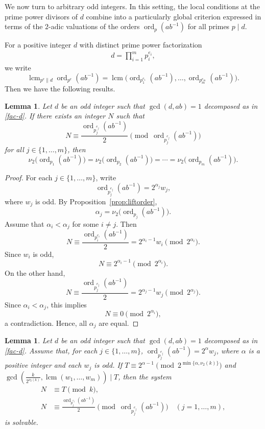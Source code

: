 \documentclass[pdflatex,sn-mathphys-num]{sn-jnl}%
\theoremstyle{thmstyleone}%
\newtheorem{lemma}[theorem]{Lemma}%
\theoremstyle{thmstyletwo}%
\theoremstyle{thmstylethree}%
\newcommand{\ord}{\operatorname{ord}}
\newcommand{\lcm}{\operatorname{lcm}}
\begin{document}
We now turn to arbitrary odd integers. In this setting, the local conditions at the prime power divisors of $d$ combine into a particularly   global criterion  expressed in terms of the $2$-adic valuations of the orders $\ord_p(ab^{-1})$ for all primes $p\mid d$.

For a positive integer $d$ with distinct prime power factorization
\begin{align}\label{fac-d}
d=\displaystyle\prod_{i=1}^m p_i^{e_i},
\end{align}
we write
\[
\lcm_{p^e\parallel d}\ord_{p^e}(ab^{-1})
=
\lcm\bigl(\ord_{p_1^{e_1}}(ab^{-1}),\dots,\ord_{p_m^{e_m}}(ab^{-1})\bigr).
\] Then we have the following results. 

\begin{lemma}\label{lem:common-alpha}
Let $d$ be an odd integer such that $\gcd(d,ab)=1$ decomposed as in \eqref{fac-d}. If there exists an integer $N$ such that
\[
N\equiv \frac{\ord_{p_j^{e_j}}(ab^{-1})}{2}
\pmod{\ord_{p_j^{e_j}}(ab^{-1})}
\]
for all  $j\in\{1,\dots,m\}$, then
\[
\nu_2\bigl(\ord_{p_1}(ab^{-1})\bigr)
=
\nu_2\bigl(\ord_{p_2}(ab^{-1})\bigr)
=
\cdots
=
\nu_2\bigl(\ord_{p_m}(ab^{-1})\bigr).
\]
\end{lemma}

\begin{proof}
For each $j\in\{1,\dots,m\}$, write
\[
\ord_{p_j^{e_j}}(ab^{-1})=2^{\alpha_j}w_j,
\]
where $w_j$ is odd. By Proposition~\ref{prop:liftorder},
\[
\alpha_j=\nu_2\bigl(\ord_{p_j}(ab^{-1})\bigr).
\]
Assume that $\alpha_i<\alpha_j$ for some $i\ne j$. Then
\[
N\equiv \frac{\ord_{p_i^{e_i}}(ab^{-1})}{2}
=2^{\alpha_i-1}w_i
\pmod{2^{\alpha_i}}.
\]
Since $w_i$ is odd,
\[
N\equiv 2^{\alpha_i-1}\pmod{2^{\alpha_i}}.
\]
On the other hand,
\[
N\equiv \frac{\ord_{p_j^{e_j}}(ab^{-1})}{2}
=2^{\alpha_j-1}w_j
\pmod{2^{\alpha_j}}.
\]
Since $\alpha_i<\alpha_j$, this implies
\[
N\equiv 0\pmod{2^{\alpha_i}},
\]
a contradiction. Hence, all $\alpha_j$ are equal.
\end{proof}

\begin{lemma}\label{lem:global-compatibility}
Let $d$ be an odd integer such that $\gcd(d,ab)=1$ decomposed as in \eqref{fac-d}. Assume that, for each $j\in\{1,\dots,m\}$,
$
\ord_{p_j^{e_j}}(ab^{-1})=2^\alpha w_j$,
where $\alpha$ is a positive integer and each $w_j$ is odd. If
$
T\equiv 2^{\alpha-1}\pmod{2^{\min\{\alpha,\nu_2(k)\}}}
$
and
$
\gcd\left(\frac{k}{2^{\nu_2(k)}},\lcm(w_1,\dots,w_m)\right)\mid T$,
then the system
\begin{align*}
N&\equiv T\pmod{k},\\
N&\equiv \frac{\ord_{p_j^{e_j}}(ab^{-1})}{2}
\pmod{\ord_{p_j^{e_j}}(ab^{-1})}
\quad (j=1,\dots,m),
\end{align*}
is solvable.
\end{lemma}
\end{document}
